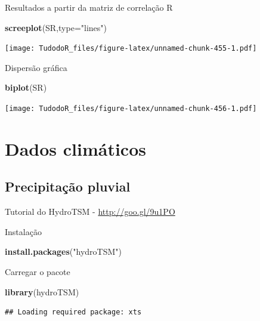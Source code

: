 \documentclass[
]{book}
\newenvironment{Shaded}{\begin{snugshade}}{\end{snugshade}}
\newcommand{\DataTypeTok}[1]{\textcolor[rgb]{0.13,0.29,0.53}{#1}}
\newcommand{\KeywordTok}[1]{\textcolor[rgb]{0.13,0.29,0.53}{\textbf{#1}}}
\newcommand{\NormalTok}[1]{#1}
\newcommand{\StringTok}[1]{\textcolor[rgb]{0.31,0.60,0.02}{#1}}
\begin{document}
Resultados a partir da matriz de correlação R

\begin{Shaded}
\begin{Highlighting}[]
\KeywordTok{screeplot}\NormalTok{(SR,}\DataTypeTok{type=}\StringTok{"lines"}\NormalTok{)}
\end{Highlighting}
\end{Shaded}

\texttt{[image: TudodoR\_files/figure-latex/unnamed-chunk-455-1.pdf]}

Dispersão gráfica

\begin{Shaded}
\begin{Highlighting}[]
\KeywordTok{biplot}\NormalTok{(SR)}
\end{Highlighting}
\end{Shaded}

\texttt{[image: TudodoR\_files/figure-latex/unnamed-chunk-456-1.pdf]}

\hypertarget{dados-climuxe1ticos-1}{%
\chapter{Dados climáticos}\label{dados-climuxe1ticos-1}}

\hypertarget{precipitauxe7uxe3o-pluvial}{%
\section{Precipitação pluvial}\label{precipitauxe7uxe3o-pluvial}}

Tutorial do HydroTSM - \url{http://goo.gl/9u1PO}

Instalação

\begin{Shaded}
\begin{Highlighting}[]
\KeywordTok{install.packages}\NormalTok{(}\StringTok{"hydroTSM"}\NormalTok{)}
\end{Highlighting}
\end{Shaded}

Carregar o pacote

\begin{Shaded}
\begin{Highlighting}[]
\KeywordTok{library}\NormalTok{(hydroTSM)}
\end{Highlighting}
\end{Shaded}

\begin{verbatim}
## Loading required package: xts
\end{verbatim}
\end{document}
